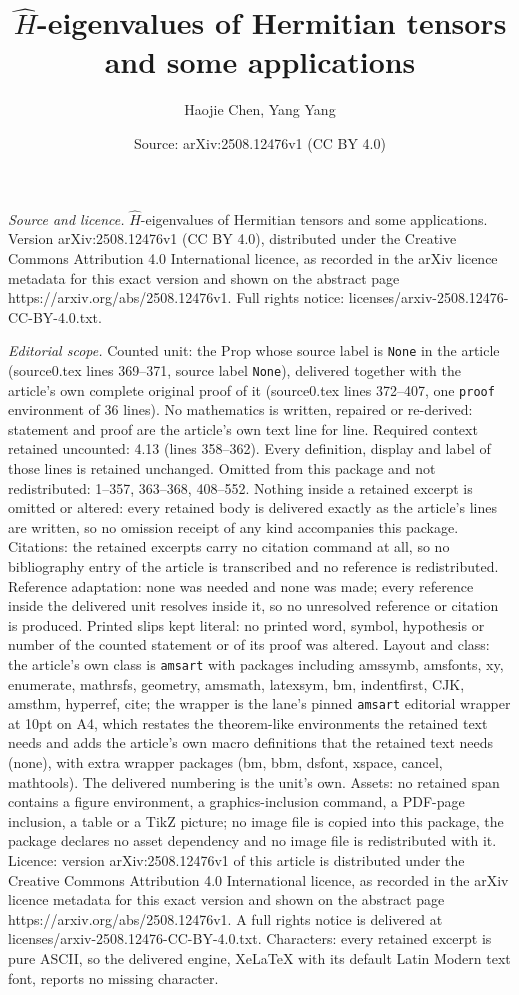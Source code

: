 \documentclass[10pt,a4paper]{amsart}
\title[$\hat{H}$-eigenvalues of Hermitian tensors and some applicat]{$\hat{H}$-eigenvalues of Hermitian tensors and some applications}
\author{Haojie Chen, Yang Yang}
\date{Source: arXiv:2508.12476v1 (CC BY 4.0)}
\begin{document}
\maketitle

\noindent\emph{Source and licence.} $\hat{H}$-eigenvalues of Hermitian tensors and some applications. Version arXiv:2508.12476v1 (CC BY 4.0), distributed under the Creative Commons Attribution 4.0 International licence, as recorded in the arXiv licence metadata for this exact version and shown on the abstract page https://arxiv.org/abs/2508.12476v1. Full rights notice: licenses/arxiv-2508.12476-CC-BY-4.0.txt.\par\smallskip

\noindent\textit{Editorial scope.} Counted unit: the Prop whose source label is \texttt{None} in the article (source0.tex lines 369--371, source label \texttt{None}), delivered together with the article's own complete original proof of it (source0.tex lines 372--407, one \texttt{proof} environment of 36 lines). No mathematics is written, repaired or re-derived: statement and proof are the article's own text line for line. Required context retained uncounted: 4.13 (lines 358--362). Every definition, display and label of those lines is retained unchanged. Omitted from this package and not redistributed: 1--357, 363--368, 408--552. Nothing inside a retained excerpt is omitted or altered: every retained body is delivered exactly as the article's lines are written, so no omission receipt of any kind accompanies this package. Citations: the retained excerpts carry no citation command at all, so no bibliography entry of the article is transcribed and no reference is redistributed. Reference adaptation: none was needed and none was made; every reference inside the delivered unit resolves inside it, so no unresolved reference or citation is produced. Printed slips kept literal: no printed word, symbol, hypothesis or number of the counted statement or of its proof was altered. Layout and class: the article's own class is \texttt{amsart} with packages including amssymb, amsfonts, xy, enumerate, mathrsfs, geometry, amsmath, latexsym, bm, indentfirst, CJK, amsthm, hyperref, cite; the wrapper is the lane's pinned \texttt{amsart} editorial wrapper at 10pt on A4, which restates the theorem-like environments the retained text needs and adds the article's own macro definitions that the retained text needs (none), with extra wrapper packages (bm, bbm, dsfont, xspace, cancel, mathtools). The delivered numbering is the unit's own. Assets: no retained span contains a figure environment, a graphics-inclusion command, a PDF-page inclusion, a table or a TikZ picture; no image file is copied into this package, the package declares no asset dependency and no image file is redistributed with it. Licence: version arXiv:2508.12476v1 of this article is distributed under the Creative Commons Attribution 4.0 International licence, as recorded in the arXiv licence metadata for this exact version and shown on the abstract page https://arxiv.org/abs/2508.12476v1. A full rights notice is delivered at licenses/arxiv-2508.12476-CC-BY-4.0.txt. Characters: every retained excerpt is pure ASCII, so the delivered engine, XeLaTeX with its default Latin Modern text font, reports no missing character.
\end{document}
